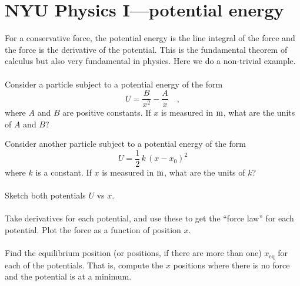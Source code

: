 \documentclass[12pt]{article}
\begin{document}
\section*{NYU Physics I---potential energy}

For a conservative force, the potential energy is the line integral of
the force and the force is the derivative of the potential.  This is
the fundamental theorem of calculus but also very fundamental in
physics.  Here we do a non-trivial example.

\paragraph{\theproblem}%
Consider a particle subject to a potential energy of the form
\begin{equation}
U = \frac{B}{x^2} - \frac{A}{x} \quad ,
\label{eq:hard}
\end{equation}
where $A$ and $B$ are positive constants.  If $x$ is measured in $\mathrm{m}$,
what are the units of $A$ and $B$?

Consider another particle subject to a potential energy of the form
\begin{equation}
U = \frac{1}{2}\,k\,(x-x_0)^2
\label{eq:easy}
\end{equation}
where $k$ is a constant.  If $x$ is measured in $\mathrm{m}$, what are
the units of $k$?

\paragraph{\theproblem}%
Sketch both potentials $U$ vs $x$.

\paragraph{\theproblem}%
Take derivatives for each potential, and use these to get the ``force law''
for each potential. Plot the force as a function of position $x$.

\paragraph{\theproblem}%
Find the equilibrium position (or positions, if there are more than
one) $x_\mathrm{eq}$ for each of the potentials.  That is, compute the
$x$ positions where there is no force and the potential is at a
minimum.
\end{document}

